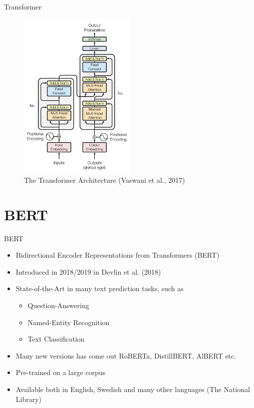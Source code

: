 \documentclass[10pt]{beamer}
\begin{document}
\begin{frame}{Transformer}

\begin{figure}[h]
\centering
\includegraphics[width=0.5\textwidth]{fig/Vaswani_1_transformer.png}
\caption{The Transformer Architecture (Vaswani et al., 2017)}
\end{figure}

\end{frame}



\section{BERT}
\frame{\sectionpage}

\begin{frame}{BERT}

\begin{itemize}
\item Bidirectional Encoder Representations from Transformers (BERT)
\item Introduced in 2018/2019 in Devlin et al. (2018)
\pause
\item {\color{uured} State-of-the-Art} in many text prediction tasks, such as
\begin{itemize}
\item Question-Answering
\item Named-Entity Recognition
\item Text Classification
\end{itemize}
\pause
\item Many new versions has come out RoBERTa, DistillBERT, AlBERT etc.
\pause
\item {\color{uured} Pre-trained} on a large corpus
\pause
\item Available both in English, Swedish and many other languages (The National Library)
\end{itemize}

\end{frame}
\end{document}
